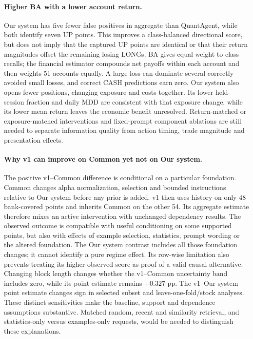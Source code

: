 \paragraph{Higher BA with a lower account return.}
Our system has five fewer false positives in aggregate than QuantAgent, while both
identify seven UP points. This improves a class-balanced directional
score, but does not imply that the captured UP points are identical or
that their return magnitudes offset the remaining losing LONGs. BA gives
equal weight to class recalls; the financial estimator compounds net
payoffs within each account and then weights 51 accounts equally. A
large loss can dominate several correctly avoided small losses, and
correct CASH predictions earn zero. Our system also opens fewer positions,
changing exposure and costs together. Its lower held-session fraction
and daily MDD are consistent with that exposure change, while its lower
mean return leaves the economic benefit unresolved. Return-matched or
exposure-matched interventions and fixed-prompt component ablations are
still needed to separate information quality from action timing, trade
magnitude and presentation effects.

\paragraph{Why v1 can improve on Common yet not on Our system.}
The positive v1--Common difference is conditional on a particular
foundation. Common changes alpha normalization, selection and bounded
instructions relative to Our system before any prior is added. v1 then
uses history on only 48 bank-covered points and inherits Common on the
other 54. Its aggregate estimate therefore mixes an active intervention
with unchanged dependency results. The observed outcome is compatible
with useful conditioning on some supported points, but also with effects
of example selection, statistics, prompt wording or the altered
foundation. The Our system contrast includes all those foundation changes;
it cannot identify a pure regime effect. Its row-wise limitation also
prevents treating its higher observed score as proof of a valid causal
alternative. Changing block length changes whether the v1--Common
uncertainty band includes zero, while its point estimate remains
$+0.327$ pp. The v1--Our system point estimate changes sign in selected subset
and leave-one-fold/stock analyses. These distinct sensitivities make the
baseline, support and dependence assumptions substantive. Matched random,
recent and similarity retrieval, and statistics-only versus examples-only
requests, would be needed to distinguish these explanations.

